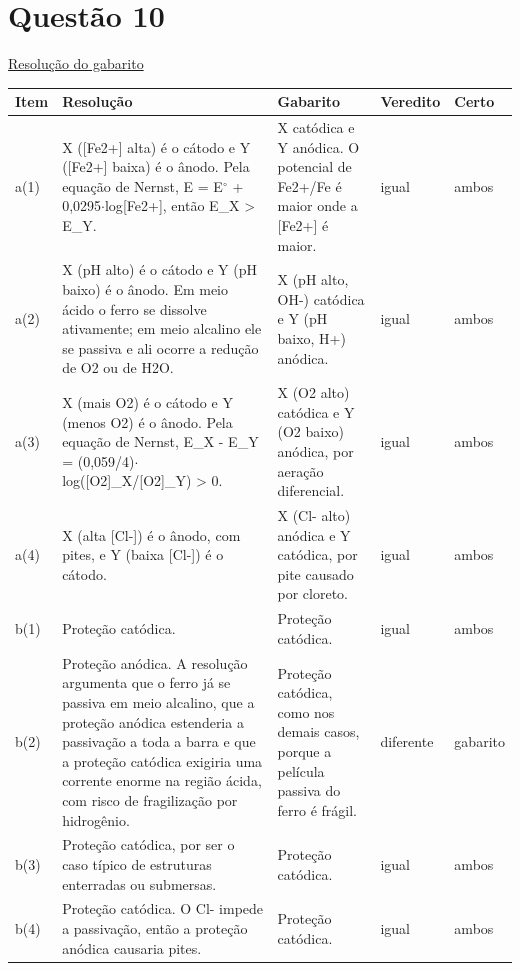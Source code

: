 \documentclass{article}%
\begin{document}
\section*{Questão 10}%
\href{https://poliedroresolve.sistemapoliedro.com.br/vestibulares/ita/2027/ita-2-fase-dia-2-21-10-2026-2-fase-dia-2/dissertativa-10-quimica-2-fase-dia-2-ita-2027}{Resolução do gabarito}\par\smallskip%
\begin{longtable}{@{}p{} p{} p{} p{} p{}@{}}\toprule Item & Resolução & Gabarito & Veredito & Certo \\ \midrule
a(1) & X ({[}Fe2+{]} alta) é o cátodo e Y ({[}Fe2+{]} baixa) é o ânodo. Pela equação de Nernst, E = E$^\circ$ + 0,0295$\cdot$log{[}Fe2+{]}, então E\_X > E\_Y. & X catódica e Y anódica. O potencial de Fe2+/Fe é maior onde a {[}Fe2+{]} é maior. & igual & ambos \\
a(2) & X (pH alto) é o cátodo e Y (pH baixo) é o ânodo. Em meio ácido o ferro se dissolve ativamente; em meio alcalino ele se passiva e ali ocorre a redução de O2 ou de H2O. & X (pH alto, OH-) catódica e Y (pH baixo, H+) anódica. & igual & ambos \\
a(3) & X (mais O2) é o cátodo e Y (menos O2) é o ânodo. Pela equação de Nernst, E\_X - E\_Y = (0,059/4)$\cdot$log({[}O2{]}\_X/{[}O2{]}\_Y) > 0. & X (O2 alto) catódica e Y (O2 baixo) anódica, por aeração diferencial. & igual & ambos \\
a(4) & X (alta {[}Cl-{]}) é o ânodo, com pites, e Y (baixa {[}Cl-{]}) é o cátodo. & X (Cl- alto) anódica e Y catódica, por pite causado por cloreto. & igual & ambos \\
b(1) & Proteção catódica. & Proteção catódica. & igual & ambos \\
b(2) & Proteção anódica. A resolução argumenta que o ferro já se passiva em meio alcalino, que a proteção anódica estenderia a passivação a toda a barra e que a proteção catódica exigiria uma corrente enorme na região ácida, com risco de fragilização por hidrogênio. & Proteção catódica, como nos demais casos, porque a película passiva do ferro é frágil. & diferente & gabarito \\
b(3) & Proteção catódica, por ser o caso típico de estruturas enterradas ou submersas. & Proteção catódica. & igual & ambos \\
b(4) & Proteção catódica. O Cl- impede a passivação, então a proteção anódica causaria pites. & Proteção catódica. & igual & ambos \\
\bottomrule\end{longtable}%
\end{document}
